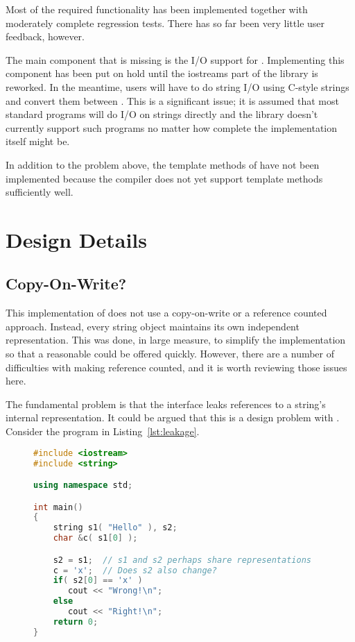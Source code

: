 Most of the required functionality has been implemented together with moderately
complete regression tests. There has so far been very little user feedback,
however.

The main component that is missing is the I/O support for .
Implementing this component has been put on hold until the iostreams part of
the library is reworked. In the meantime, users will have to do string I/O
using C-style strings and convert them between . This is a
significant issue; it is assumed that most standard programs will do I/O on
strings directly and the library doesn't currently support such programs no
matter how complete the  implementation itself might be.

In addition to the problem above, the template methods of 
have not been implemented because the compiler does not yet support template
methods sufficiently well.

\section{Design Details}

\subsection{Copy-On-Write?}

This implementation of  does not use a copy-on-write or a
reference counted approach. Instead, every string object maintains its own
independent representation. This was done, in large measure, to simplify the
implementation so that a reasonable  could be offered
quickly. However, there are a number of difficulties with making
 reference counted, and it is worth reviewing those issues
here.

The fundamental problem is that the  interface leaks
references to a string's internal representation. It could be argued that this
is a design problem with . Consider the program in
Listing~\ref{lst:leakage}.

\begin{figure}[htbp]
\centering
\begin{lstlisting}[language=C++,caption={Potential Reference Leakage},label={lst:leakage}]
#include <iostream>
#include <string>

using namespace std;

int main()
{
    string s1( "Hello" ), s2;
    char &c( s1[0] );

    s2 = s1;  // s1 and s2 perhaps share representations
    c = 'x';  // Does s2 also change?
    if( s2[0] == 'x' )
       cout << "Wrong!\n";
    else
       cout << "Right!\n";
    return 0;
}
\end{lstlisting}
\end{figure}


